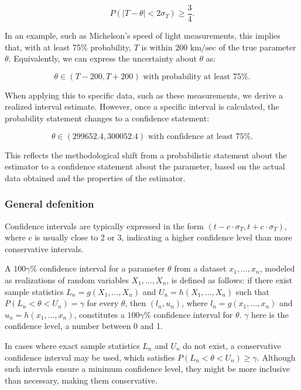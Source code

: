 \documentclass{article}
\begin{document}
\begin{equation*}
P\left(|T-\theta| < 2\sigma_T\right) \geq \frac{3}{4}.
\end{equation*}

In an example, such as Michelson's speed of light measurements, this implies that, with at least 75\% probability, $T$ is within $200 \text{ km/sec}$ of the true parameter $\theta$. Equivalently, we can express the uncertainty about $\theta$ as:

\begin{equation*}
\theta \in (T-200, T+200) \text{ with probability at least } 75\%.
\end{equation*}

When applying this to specific data, such as these measurements, we derive a realized interval estimate. However, once a specific interval is calculated, the probability statement changes to a confidence statement:

\begin{equation*}
\theta \in (299652.4, 300052.4) \text{ with confidence at least } 75\%.
\end{equation*}

This reflects the methodological shift from a probabilistic statement about the estimator to a confidence statement about the parameter, based on the actual data obtained and the properties of the estimator.

\subsubsection{General defenition}

Confidence intervals are typically expressed in the form $(t-c \cdot \sigma_{T}, t+c \cdot \sigma_{T})$, where $c$ is usually close to 2 or 3, indicating a higher confidence level than more conservative intervals. 

A $100\gamma\%$ confidence interval for a parameter $\theta$ from a dataset $x_1, \ldots, x_n$, modeled as realizations of random variables $X_1, \ldots, X_n$, is defined as follows: if there exist sample statistics $L_n=g(X_1, \ldots, X_n)$ and $U_n=h(X_1, \ldots, X_n)$ such that $P(L_n < \theta < U_n) = \gamma$ for every $\theta$, then $(l_n, u_n)$, where $l_n=g(x_1, \ldots, x_n)$ and $u_n=h(x_1, \ldots, x_n)$, constitutes a $100\gamma\%$ confidence interval for $\theta$. $\gamma$ here is the confidence level, a number between 0 and 1.

In cases where exact sample statistics $L_n$ and $U_n$ do not exist, a conservative confidence interval may be used, which satisfies $P(L_n < \theta < U_n) \geq \gamma$. Although such intervals ensure a minimum confidence level, they might be more inclusive than necessary, making them conservative.
\end{document}
